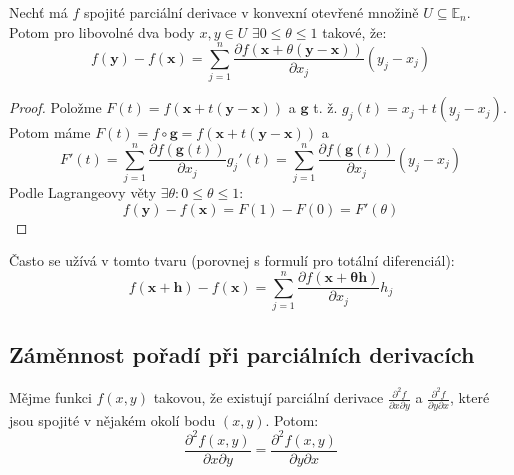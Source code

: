 \documentclass[../main.tex]{subfiles}
\begin{document}
\begin{theorem} \label{lagrange1}
	Nechť má $f$ spojité parciální derivace v konvexní otevřené množině $U \subseteq \mathbb{E}_{n}$.
	Potom pro libovolné dva body $x,y \in U$ $\exists 0 \leq \theta \leq 1$ takové, že:
	\[ f(\mathbf{y}) - f(\mathbf{x}) =
	\sum^{n}_{j=1} \frac{\partial f(\mathbf{x} + \theta (\mathbf{y}-\mathbf{x}))}{\partial x_j}(y_j - x_j) \]
\end{theorem}

\begin{proof}
	Položme $F(t) = f(\mathbf{x} + t(\mathbf{y} - \mathbf{x}))$ a $\mathbf{g}$ t. ž. $g_j(t) = x_j + t(y_j - x_j)$.
	Potom máme $F(t) = f \circ \mathbf{g} = f(\mathbf{x} + t(\mathbf{y}-\mathbf{x}))$ a
	\[ F'(t) = \sum^{n}_{j=1} \frac{\partial f(\mathbf{g}(t))}{\partial x_j}g_j'(t) =
	\sum^{n}_{j=1} \frac{\partial f(\mathbf{g}(t))}{\partial x_j}(y_j - x_j)  \]
	Podle Lagrangeovy věty $\exists \theta : 0 \leq \theta \leq 1$:
	\[ f(\mathbf{y}) - f(\mathbf{x}) = F(1) - F(0) = F'(\theta) \]
\end{proof}


\begin{remark}
	Často se užívá v tomto tvaru (porovnej s formulí pro totální diferenciál):
	\[ f(\mathbf{x} + \mathbf{h}) - f(\mathbf{x}) =
	\sum^{n}_{j=1} \frac{\partial f(\mathbf{x + \theta \mathbf{h}})}{\partial x_j}h_j \]
\end{remark}

\subsection{Záměnnost pořadí při parciálních derivacích}
\begin{theorem}
	Mějme funkci $f(x,y)$ takovou, že existují parciální derivace
	$\frac{\partial ^2 f}{\partial x \partial y}$ a $\frac{\partial ^2 f}{\partial y \partial x}$, které
	jsou spojité v nějakém okolí bodu $(x,y)$. Potom:
	\[ \frac{\partial ^2 f(x,y)}{\partial x \partial y} = \frac{\partial ^2 f(x,y)}{\partial y \partial x} \]
\end{theorem}
\end{document}
